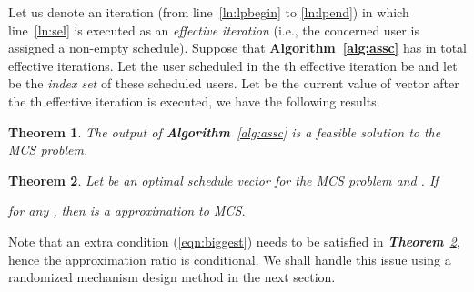 \documentclass[10pt,journal,compsoc]{IEEEtran}
\newtheorem{theorem}{\textbf{Theorem}}
\begin{document}
  Let us denote an iteration (from line~\ref{ln:lpbegin} to \ref{ln:lpend}) in which line~\ref{ln:sel} is executed as an \textit{effective iteration} (i.e., the concerned user is assigned a non-empty schedule). Suppose that \textbf{Algorithm~\ref{alg:assc}} has in total  effective iterations. Let the user scheduled in the th effective iteration be  and let  be the \textit{index set} of these scheduled users. Let  be the current value of vector  after the th effective iteration is executed, we have the following results. 

  \begin{theorem}
    The output of \textbf{Algorithm}~\ref{alg:assc} is a feasible solution to the MCS problem.
    \label{thm:correctness}
  \end{theorem}





  \begin{theorem}
    Let  be an optimal schedule vector for the MCS problem and . If

for any , then  is a  approximation to MCS.
    \label{thm:conditionalar}
  \end{theorem}
Note that an extra condition (\ref{eqn:biggest}) needs to be satisfied in \textit{\textbf{Theorem}~\ref{thm:conditionalar}}, hence the approximation ratio is conditional. We shall handle this issue using a randomized mechanism design method in the next section.
\end{document}
